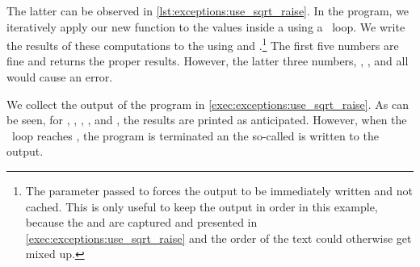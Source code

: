 The latter can be observed in \cref{lst:exceptions:use_sqrt_raise}.
In the program, we iteratively apply our new  function to the values inside a  using a ~loop.
We write the results of these computations to the  using  and .\footnote{%
The  parameter passed to  forces the output to be immediately written and not cached. %
This is only useful to keep the output in order in this example, because the  and  are captured and presented in \cref{exec:exceptions:use_sqrt_raise} and the order of the text could otherwise get mixed up.%
}
The first five numbers are fine and  returns the proper results.
However, the latter three numbers, , , and  all would cause an error.

We collect the output of the program in \cref{exec:exceptions:use_sqrt_raise}.
As can be seen, for , , , , and , the results are printed as anticipated.
However, when the ~loop reaches , the program is terminated an the so-called  is written to the output.

